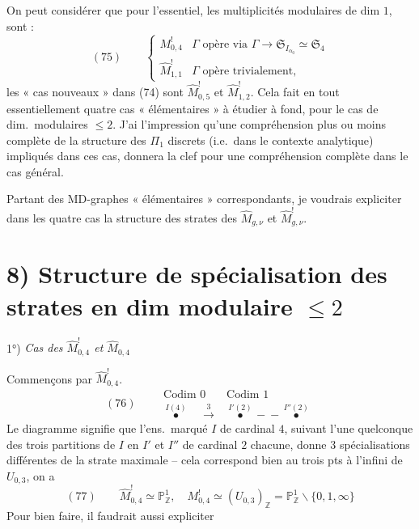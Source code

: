 \documentclass[11pt,a4paper]{article}
\begin{document}
On peut considérer que pour l'essentiel, les  \struck{\ill{}} multiplicités  modulaires de dim $1$, \struck{\ill{}}  sont :
\[
(75)\qquad
\left\{
\begin{array}{ll}
M^{!}_{0,4} & \Gamma \text{ opère via } \Gamma \to \mathfrak{S}_{I_{\alpha_0}} \simeq \mathfrak{S}_4 \\[2pt]
\widehat{M}^{!}_{1,1} & \Gamma \text{ opère trivialement,}
\end{array}
\right.
\]
les « cas nouveaux » dans (74) sont $\widehat{M}^{!}_{0,5}$ et $\widehat{M}^{!}_{1,2}$. Cela fait en tout essentiellement quatre cas « élémentaires » à étudier à fond, pour le cas de dim.\ modulaires $\leqslant 2$. J'ai l'impression qu'une compréhension plus ou moins complète de la structure des $\Pi_1$ discrets (i.e.\ dans le contexte analytique) impliqués dans ces cas, donnera la clef pour une compréhension complète dans le cas général.

Partant des MD-graphes « élémentaires » correspondants, je voudrais expliciter dans les quatre cas la structure  des strates des $\widehat{M}_{g,\nu}$ et $\widehat{M}^{!}_{g,\nu}$.

\section{8) Structure de spécialisation des strates en dim modulaire $\leqslant 2$}

1°) \emph{Cas des $\widehat{M}^{!}_{0,4}$ et $\widehat{M}_{0,4}$}

Commençons par $\widehat{M}^{!}_{0,4}$.
\[
(76)\qquad
\begin{array}{c|c}
\text{Codim } 0 & \text{Codim } 1 \\ \hline
\overset{I(4)}{\bullet} \quad \xrightarrow{\ 3\ } & \overset{I'(2)}{\bullet}\!\!-\!\!\!-\!\!\overset{I''(2)}{\bullet}
\end{array}
\]
Le diagramme signifie que l'ens.\ marqué $I$ de cardinal $4$,  suivant l'une quelconque des trois partitions de $I$ en $I'$ et $I''$ de cardinal $2$ chacune, donne $3$ spécialisations différentes de la strate maximale -- cela correspond bien au   trois pts à l'infini de $U_{0,3}$,  on a
\[
(77)\qquad \widehat{M}^{!}_{0,4} \simeq \mathbb{P}^1_{\mathbb{Z}}, \quad M^{!}_{0,4} \simeq (U_{0,3})_{\mathbb{Z}} = \mathbb{P}^1_{\mathbb{Z}} \smallsetminus \{0, 1, \infty\}
\]
Pour bien faire, il faudrait aussi expliciter
\end{document}
